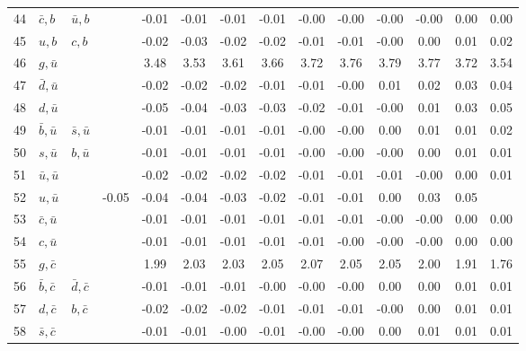 \begin{tabularx}{\textwidth}{rXXX@{}S@{}S@{}S@{}S@{}S@{}S@{}S@{}S@{}S@{}S}
 44 & $\bar c, b$      & $\bar u, b$       &                  & -0.01 & -0.01 & -0.01 & -0.01 & -0.00 & -0.00 & -0.00 & -0.00 &  0.00 &  0.00 \\
 45 & $u, b$           & $c, b$            &                  & -0.02 & -0.03 & -0.02 & -0.02 & -0.01 & -0.01 & -0.00 &  0.00 &  0.01 &  0.02 \\
 46 & $g, \bar u$      &                   &                  &  3.48 &  3.53 &  3.61 &  3.66 &  3.72 &  3.76 &  3.79 &  3.77 &  3.72 &  3.54 \\
 47 & $\bar d, \bar u$ &                   &                  & -0.02 & -0.02 & -0.02 & -0.01 & -0.01 & -0.00 &  0.01 &  0.02 &  0.03 &  0.04 \\
 48 & $d, \bar u$      &                   &                  & -0.05 & -0.04 & -0.03 & -0.03 & -0.02 & -0.01 & -0.00 &  0.01 &  0.03 &  0.05 \\
 49 & $\bar b, \bar u$ & $\bar s, \bar u$  &                  & -0.01 & -0.01 & -0.01 & -0.01 & -0.00 & -0.00 &  0.00 &  0.01 &  0.01 &  0.02 \\
 50 & $s, \bar u$      & $b, \bar u$       &                  & -0.01 & -0.01 & -0.01 & -0.01 & -0.00 & -0.00 & -0.00 &  0.00 &  0.01 &  0.01 \\
 51 & $\bar u, \bar u$ &                   &                  & -0.02 & -0.02 & -0.02 & -0.02 & -0.01 & -0.01 & -0.01 & -0.00 &  0.00 &  0.01 \\
 52 & $u, \bar u$                          &                  & -0.05 & -0.04 & -0.04 & -0.03 & -0.02 & -0.01 & -0.01 &  0.00 &  0.03 &  0.05 \\
 53 & $\bar c, \bar u$ &                   &                  & -0.01 & -0.01 & -0.01 & -0.01 & -0.01 & -0.01 & -0.00 & -0.00 &  0.00 &  0.00 \\
 54 & $c, \bar u$      &                   &                  & -0.01 & -0.01 & -0.01 & -0.01 & -0.01 & -0.00 & -0.00 & -0.00 &  0.00 &  0.00 \\
 55 & $g, \bar c$      &                   &                  &  1.99 &  2.03 &  2.03 &  2.05 &  2.07 &  2.05 &  2.05 &  2.00 &  1.91 &  1.76 \\
 56 & $\bar b, \bar c$ & $\bar d, \bar c$  &                  & -0.01 & -0.01 & -0.01 & -0.00 & -0.00 & -0.00 &  0.00 &  0.00 &  0.01 &  0.01 \\
 57 & $d, \bar c$      & $b, \bar c$       &                  & -0.02 & -0.02 & -0.02 & -0.01 & -0.01 & -0.01 & -0.00 &  0.00 &  0.01 &  0.01 \\
 58 & $\bar s, \bar c$ &                   &                  & -0.01 & -0.01 & -0.00 & -0.01 & -0.00 & -0.00 &  0.00 &  0.01 &  0.01 &  0.01 \\

\end{tabularx}
